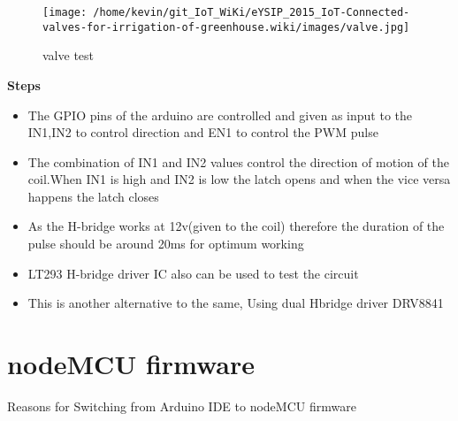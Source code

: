 \documentclass[16pt]{article}
\begin{document}
\begin{figure}

\hspace{2cm}
\texttt{[image: /home/kevin/git\_IoT\_WiKi/eYSIP\_2015\_IoT-Connected-valves-for-irrigation-of-greenhouse.wiki/images/valve.jpg]}
\caption{valve test}
\end{figure}

\textbf{Steps}

\begin{itemize}

\item
  The GPIO pins of the arduino are controlled and given as input to the
  IN1,IN2 to control direction and EN1 to control the PWM pulse
\item
  The combination of IN1 and IN2 values control the direction of motion
  of the coil.When IN1 is high and IN2 is low the latch opens and when
  the vice versa happens the latch closes
\item
  As the H-bridge works at 12v(given to the coil) therefore the duration
  of the pulse should be around 20ms for optimum working
\item
  LT293 H-bridge driver IC also can be used to test the
  circuit%
\item
  This is another alternative to the same, Using dual Hbridge driver
  DRV8841
\end{itemize}



\vspace{19cm}
\section{nodeMCU firmware}
\vspace{0.5cm}

Reasons for Switching from Arduino IDE to nodeMCU firmware
\end{document}
